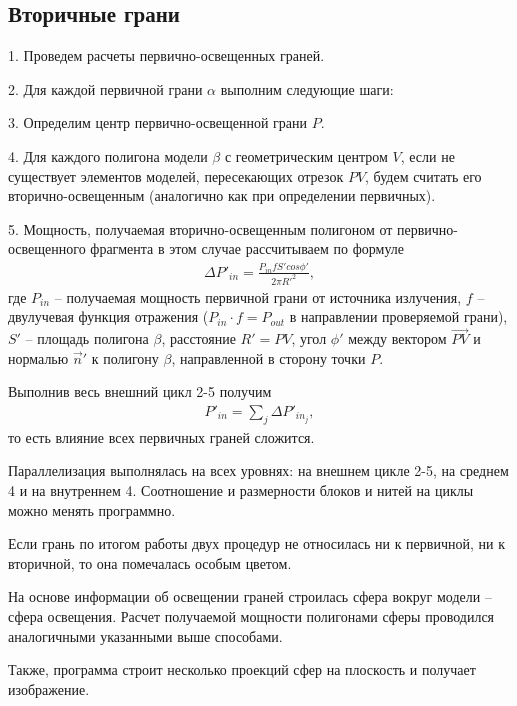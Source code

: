 \subsection*{Вторичные грани}

1. Проведем расчеты первично-освещенных граней.

2. Для каждой первичной грани $\alpha$ выполним следующие шаги:

3. Определим центр первично-освещенной грани $P$.

4. Для каждого полигона модели $\beta$ с геометрическим центром $V$, если не существует элементов моделей, пересекающих отрезок $PV$, будем считать его вторично-освещенным (аналогично как при определении первичных).

5. Мощность, получаемая вторично-освещенным полигоном от первично-освещенного фрагмента в этом случае рассчитываем по формуле
\begin{gather}
  \Delta P'_{in} = \frac{P_{in} f S' cos\phi'}{2 \pi R'^2},
\end{gather}
где $ P_{in} $ -- получаемая мощность первичной грани от источника излучения, $ f $ -- двулучевая функция отражения ($ P_{in} \cdot f = P_{out} $ в направлении проверяемой грани), $ S' $ -- площадь полигона $ \beta $, расстояние $R' = PV$, угол $\phi'$ между вектором $\vec {PV}$ и нормалью $\vec n'$ к полигону $\beta$, направленной в сторону точки $P$.

Выполнив весь внешний цикл 2-5 получим 
\begin{gather}
  P'_{in} = \sum_j \Delta P'_{in_j},
\end{gather}
то есть влияние всех первичных граней сложится.

Параллелизация выполнялась на всех уровнях: на внешнем цикле 2-5, на среднем 4 и на внутреннем 4. Соотношение и размерности блоков и нитей на циклы можно менять программно. 

Если грань по итогом работы двух процедур не относилась ни к первичной, ни к вторичной, то она помечалась особым цветом. 

На основе информации об освещении граней строилась сфера вокруг модели -- сфера освещения. Расчет получаемой мощности полигонами сферы проводился аналогичными указанными выше способами. 

Также, программа строит несколько проекций сфер на плоскость и получает изображение.